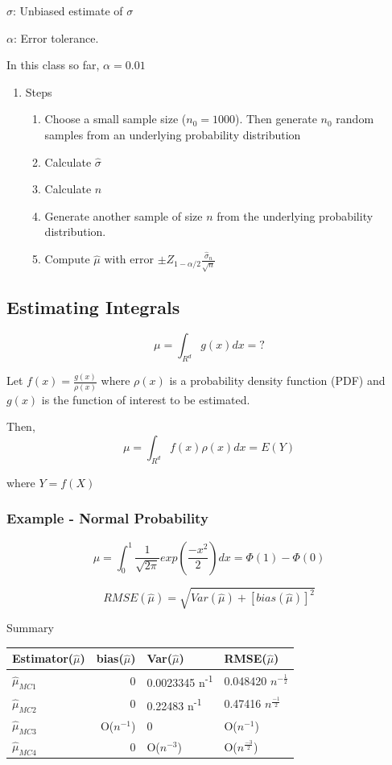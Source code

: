 \documentclass[11pt]{article}
\begin{document}
\(\hat \sigma\): Unbiased estimate of \(\sigma\)

\(\alpha\): Error tolerance.

In this class so far, \(\alpha = 0.01\)

\begin{enumerate}
\item Steps
\label{sec:org131e454}

\begin{enumerate}
\item Choose a small sample size (\(n_0 = 1000\)). Then generate \(n_0\) random samples
from an underlying probability distribution
\item Calculate \(\hat \sigma\)
\item Calculate \(n\)
\item Generate another sample of size \(n\) from the underlying probability
distribution.
\item Compute \(\hat \mu\) with error \(\pm Z_{1 - \alpha/2} \frac{\hat \sigma_n}{\sqrt{n}}\)
\end{enumerate}
\end{enumerate}

\subsection{Estimating Integrals}
\label{sec:org943f12e}

$$
\mu = \int_{R^d} g(x)dx = ?
$$

Let \(f(x) = \frac{g(x)}{\rho(x)}\) where \(\rho(x)\) is a probability density
function (PDF) and \(g(x)\) is the function of interest to be estimated.

Then,
$$
\mu = \int_{R^d} f(x) \rho(x) dx = E(Y)
$$

where \(Y = f(X)\)

\subsubsection{Example - Normal Probability}
\label{sec:orgb757e87}

$$
\mu = \int_0^1 \frac{1}{\sqrt{2 \pi}} exp(\frac{-x^2}{2}) dx = \Phi(1) - \Phi(0)
$$

$$
RMSE(\hat \mu) = \sqrt{Var(\hat \mu) + [bias(\hat \mu)]^2}
$$

Summary
\begin{center}
\begin{tabular}{lrll}
Estimator(\(\hat{\mu}\)) & bias(\(\hat \mu\)) & Var(\(\hat \mu\)) & RMSE(\(\hat \mu\))\\
\hline
\(\hat \mu_{MC1}\) & 0 & 0.0023345 n\textsuperscript{-1} & 0.048420 \(n^{-\frac{1}{2}}\)\\
\(\hat \mu_{MC2}\) & 0 & 0.22483 n\textsuperscript{-1} & 0.47416 \(n^{\frac{-1}{2}}\)\\
\(\hat \mu_{MC3}\) & O(\(n^{-1}\)) & 0 & O(\(n^{-1}\))\\
\(\hat \mu_{MC4}\) & 0 & O(\(n^{-3}\)) & O(\(n^{\frac{-3}{2}}\))\\
\end{tabular}
\end{center}
\end{document}
